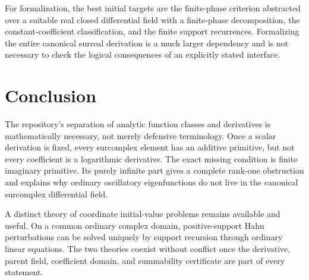\documentclass[11pt,letterpaper]{article}
\numberwithin{equation}{section}
\theoremstyle{definition}
\theoremstyle{remark}
\begin{document}
For formalization, the best initial targets are the finite-phase criterion abstracted over a suitable real closed differential field with a finite-phase decomposition, the constant-coefficient classification, and the finite support recurrences. Formalizing the entire canonical surreal derivation is a much larger dependency and is not necessary to check the logical consequences of an explicitly stated interface.

\section{Conclusion}
The repository's separation of analytic function classes and derivatives is mathematically necessary, not merely defensive terminology. Once a scalar derivation is fixed, every surcomplex element has an additive primitive, but not every coefficient is a logarithmic derivative. The exact missing condition is finite imaginary primitive. Its purely infinite part gives a complete rank-one obstruction and explains why ordinary oscillatory eigenfunctions do not live in the canonical surcomplex differential field.

A distinct theory of coordinate initial-value problems remains available and useful. On a common ordinary complex domain, positive-support Hahn perturbations can be solved uniquely by support recursion through ordinary linear equations. The two theories coexist without conflict once the derivative, parent field, coefficient domain, and summability certificate are part of every statement.

\appendix
\end{document}
